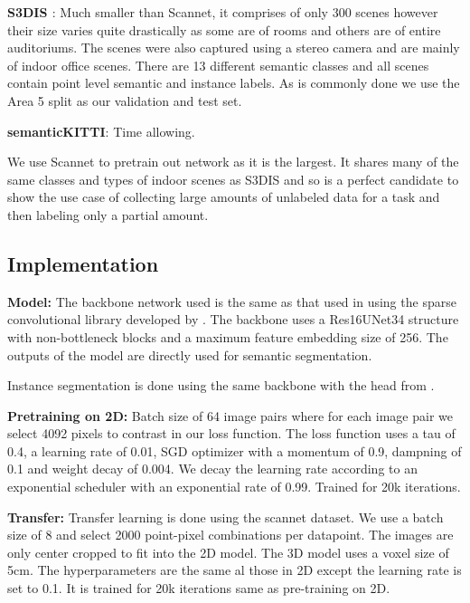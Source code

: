 \documentclass[10pt,twocolumn,letterpaper]{article}
\begin{document}
\textbf{S3DIS \cite{armeni20163D}}: Much smaller than Scannet, it comprises of only 300 scenes however their size varies quite drastically as some are of rooms and others are of entire auditoriums. The scenes were also captured using a stereo camera and are mainly of indoor office scenes. There are 13 different semantic classes and all scenes contain point level semantic and instance labels. As is commonly done \cite{xie2020pointcontrast, hou2021Exploring} we use the Area 5 split as our validation and test set.

\textbf{semanticKITTI}: Time allowing.

We use Scannet to pretrain out network as it is the largest. It shares many of the same classes and types of indoor scenes as S3DIS and so is a perfect candidate to show the use case of collecting large amounts of unlabeled data for a task and then labeling only a partial amount.

\subsection{Implementation}
\label{sec:results:implementation}

\textbf{Model:} The backbone network used is the same as that used in \cite{xie2020pointcontrast, hou2021Exploring} using the sparse convolutional library developed by \cite{choy20194d}. The backbone uses a Res16UNet34 structure with non-bottleneck blocks and a maximum feature embedding size of 256. The outputs of the model are directly used for semantic segmentation.

Instance segmentation is done using the same backbone with the head from \cite{jiang2020pointgroup}.

\textbf{Pretraining on 2D:} Batch size of 64 image pairs where for each image pair we select 4092 pixels to contrast in our loss function. The loss function uses a tau of 0.4, a learning rate of 0.01, SGD optimizer with a momentum of 0.9, dampning of 0.1 and weight decay of 0.004. We decay the learning rate according to an exponential scheduler with an exponential rate of 0.99. Trained for 20k iterations.

\textbf{Transfer:} Transfer learning is done using the scannet dataset. We use a batch size of 8 and select 2000 point-pixel combinations per datapoint. The images are only center cropped to fit into the 2D model. The 3D model uses a voxel size of 5cm. The hyperparameters are the same al those in 2D except the learning rate is set to 0.1. It is trained for 20k iterations same as pre-training on 2D.
\end{document}
